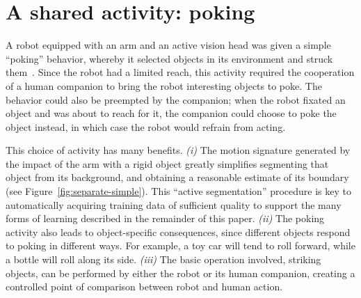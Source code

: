 \section{A shared activity: poking}

A robot equipped with an arm and an active vision head was given a
simple ``poking'' behavior, whereby it selected objects in its
environment and struck them~\citep{fitzpatrick02towards}.
Since the robot had a limited reach,
this activity required the cooperation of a human
companion to bring the robot interesting objects to poke.
The behavior could also be preempted by the companion; when the robot
fixated an object and was about to reach for it, the companion
could choose to poke the object instead, in which case the robot
would refrain from acting.

This choice of activity has many benefits.  
%
{\em (i)}
The motion signature
generated by the impact of the arm with a rigid object greatly
simplifies segmenting that object from its background, and obtaining a
reasonable estimate of its boundary (see
Figure~\ref{fig:separate-simple}).  
This ``active segmentation''
procedure is key to automatically acquiring training data of
sufficient quality to support the many forms of learning described in
the remainder of this paper.
%
{\em (ii)}
The poking activity also leads to object-specific consequences, since
different objects respond to poking in different ways.  For example,
a toy car will tend to roll forward, while a bottle will roll along its
side.
%
{\em (iii)}
The basic operation involved, striking objects, can be performed
by either the robot or its human companion, creating a
controlled point of 
comparison between robot and human action.


%



